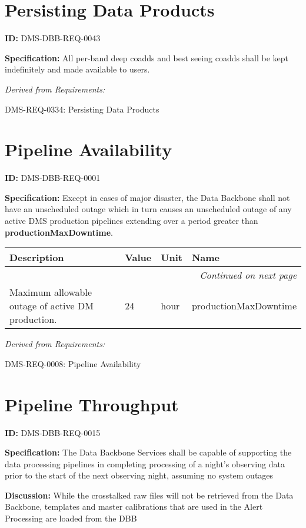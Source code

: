 \documentclass[SE,toc,lsstdraft]{lsstdoc}
\makeatletter
\newcommand{\paramname}[1]{\hspace{0pt}#1}
\newcommand{\unitname}[1]{\hspace{0pt}#1}
\newenvironment{parameters}[0]{%
\setlength\LTleft{0pt}
\setlength\LTright{\fill}
\begin{small}
\begin{longtable}[]{|p{0.49\textwidth}|l|p{0.6in}|p{1.70in}@{}|}

\hline \textbf{Description} & \textbf{Value} & \textbf{Unit} & \textbf{Name} \\ \hline
\endhead

\hline \multicolumn{4}{r}{\emph{Continued on next page}} \\
\endfoot

\hline\hline
\endlastfoot
}{%
\hline
\end{longtable}
\end{small}
}
\makeatother
\begin{document}
\section{Persisting Data Products}

\label{DMS-DBB-REQ-0043}
\textbf{ID:} DMS-DBB-REQ-0043

\textbf{Specification:}
All per-band deep coadds and best seeing coadds shall be kept indefinitely and made available to users.

\emph{Derived from Requirements:}

DMS-REQ-0334:
Persisting Data Products \newline

\section{Pipeline Availability}

\label{DMS-DBB-REQ-0001}
\textbf{ID:} DMS-DBB-REQ-0001

\textbf{Specification:}
Except in cases of major disaster, the Data Backbone shall not have an unscheduled outage which in turn causes an unscheduled outage of any active DMS production pipelines extending over a period greater than \textbf{productionMaxDowntime}.

\begin{parameters}
Maximum allowable outage of active DM production.
&
24
&
\unitname{%
hour
}
&
\paramname{%
productionMaxDowntime
} \\\hline
\end{parameters}

\emph{Derived from Requirements:}

DMS-REQ-0008:
Pipeline Availability \newline

\section{Pipeline Throughput}

\label{DMS-DBB-REQ-0015}
\textbf{ID:} DMS-DBB-REQ-0015

\textbf{Specification:}
The Data Backbone Services shall be capable of supporting the data processing pipelines in completing processing of a night’s observing data prior to the start of the next observing night, assuming no system outages

\textbf{Discussion:}
While the crosstalked raw files will not be retrieved from the Data Backbone, templates and master calibrations that are used in the Alert Processing are loaded from the DBB
\end{document}
